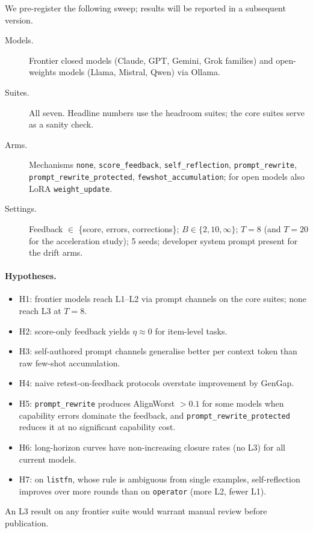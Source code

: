 \documentclass[11pt]{article}
\begin{document}
We pre-register the following sweep; results will be reported in a subsequent version.
\begin{description}
  \item[Models.] Frontier closed models (Claude, GPT, Gemini, Grok families) and open-weights models (Llama, Mistral, Qwen) via Ollama.
  \item[Suites.] All seven. Headline numbers use the headroom suites; the core suites serve as a sanity check.
  \item[Arms.] Mechanisms \texttt{none}, \texttt{score\_feedback}, \texttt{self\_reflection}, \texttt{prompt\_rewrite}, \texttt{prompt\_rewrite\_protected}, \texttt{fewshot\_accumulation}; for open models also LoRA \texttt{weight\_update}.
  \item[Settings.] Feedback $\in$ \{score, errors, corrections\}; $B \in \{2, 10, \infty\}$; $T{=}8$ (and $T{=}20$ for the acceleration study); 5 seeds; developer system prompt present for the drift arms.
\end{description}

\paragraph{Hypotheses.}
\begin{itemize}
  \item H1: frontier models reach L1--L2 via prompt channels on the core suites; none reach L3 at $T{=}8$.
  \item H2: score-only feedback yields $\eta \approx 0$ for item-level tasks.
  \item H3: self-authored prompt channels generalise better per context token than raw few-shot accumulation.
  \item H4: naive retest-on-feedback protocols overstate improvement by GenGap.
  \item H5: \texttt{prompt\_rewrite} produces AlignWorst $> 0.1$ for some models when capability errors dominate the feedback, and \texttt{prompt\_rewrite\_protected} reduces it at no significant capability cost.
  \item H6: long-horizon curves have non-increasing closure rates (no L3) for all current models.
  \item H7: on \texttt{listfn}, whose rule is ambiguous from single examples, self-reflection improves over more rounds than on \texttt{operator} (more L2, fewer L1).
\end{itemize}
An L3 result on any frontier suite would warrant manual review before publication.
\end{document}
